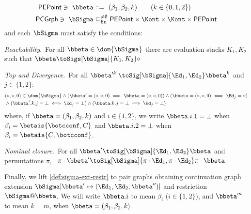 \begin{definition}
  \begin{align*}
    \mathsf{PEPoint} \ni \ \bbeta &::=\ (\beta_1, \beta_2, k)  \qquad (k\in\{0,1,2\})\\
    \mathsf{PCGrph}\ni \ \bSigma &\subseteq_{\rm fin}^{\neq\emptyset} \mathsf{PEPoint}\times\Kont\times\Kont\times\mathsf{PEPoint}
  \end{align*}
 and each $\bSigma$ must satisfy the conditions: %
  \begin{compactitem}
  \item{} \emph{Reachability}.~For all $\bbeta\in\dom{\bSigma}$ there are evaluation stacks $K_1,K_2$ such that $\bbeta\toSigs[\bSigma]{K_1,K_2}\diamond$

  \item \emph{Top and Divergence}.~For all $\bbeta'^{k'}\toSig[\bSigma]{\Ed_1,\Ed_2}\bbeta^{k}$ and $j\in\{1,2\}$:
  \begin{align*}
    &    (\diamond,\diamond,0)\in\dom{\bSigma}\land (\bbeta'=(\diamond,\diamond,0)\implies\bbeta=(\diamond,\diamond,0)) \land
    (\bbeta=(\diamond,\diamond,0)\iff\Ed_j=\diamond) \\
&{}\land    (\bbeta'.k.j=\bot\iff \Ed_j=\bot) \land
(\bbeta.k.j=\bot\implies
    \Ed_j=\bot)
  \end{align*}
    where, if $\bbeta = (\beta_1,\beta_2, k)$ and $i \in\{1,2\}$, we write $\bbeta.i.1=\bot$ when $\beta_i=\betais{\botcconf,C}$ 
    and $\bbeta.i.2=\bot$ when $\beta_i=\betais{C,\botcconf}$.
  \item \emph{Nominal closure}.~For  all $\bbeta'\toSig[\bSigma]{\Ed_1,\Ed_2}\bbeta$ and permutations $\pi$, \
    $\pi\cdot\bbeta'\toSig[\bSigma]{\pi\cdot\Ed_1,\pi\cdot\Ed_2}\pi\cdot\bbeta$.
\end{compactitem}

Finally, we lift \cref{def:sigma-ext-restr} to pair graphs obtaining continuation graph extension
  $\bSigma[\bbeta'\mapsto(\Ed_1,\Ed_2,\bbeta'')]$
and restriction $\bSigma@\bbeta$.
We will write $\bbeta.i$ to mean $\beta_i$ ($i\in\{1,2\}$), and $\bbeta^m$ to mean $k=m$, when $\bbeta = (\beta_1,\beta_2,k)$.
\end{definition}

